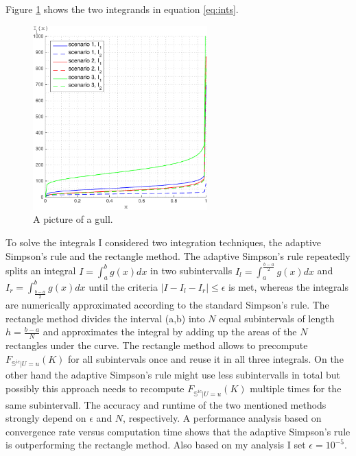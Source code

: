 \documentclass[a4paper]{article}
\begin{document}
Figure \ref{fig:ints} shows the two integrands in equation \ref{eq:ints}. 
\begin{figure}[h!]
	\centering
	\includegraphics[width=0.6\textwidth]{graphics/ints_noTitle.pdf}
	\caption{A picture of a gull.}
	\label{fig:ints}
\end{figure}
To solve the integrals I considered two integration techniques, the adaptive Simpson's rule and the rectangle method. The adaptive Simpson's rule repeatedly splits an integral $I = \int_a^b g(x) dx$ in two subintervalls $ I_l = \int_a^{\frac{b-a}{2}} g(x) dx$ and $I_r = \int_{\frac{b-a}{2}}^b g(x) dx$ until the criteria $|I-I_l-I_r| \leq \epsilon$ is met, whereas the integrals are numerically approximated according to the standard Simpson's rule. The rectangle method divides the interval (a,b) into $N$ equal subintervals of length $h=\frac{b-a}{N}$ and approximates the integral by adding up the areas of the $N$ rectangles under the curve. The rectangle method allows to precompute $F_{\mathbb{S}^{ic}|U=u}(K)$ for all subintervals once and reuse it in all three integrals. On the other hand the adaptive Simpson's rule might use less subintervalls in total but possibly this approach needs to recompute $F_{\mathbb{S}^{ic}|U=u}(K)$ multiple times for the same subintervall. The accuracy and runtime of the two mentioned methods strongly depend on $\epsilon$ and $N$, respectively. A performance analysis based on convergence rate versus computation time shows that the adaptive Simpson's rule is outperforming the rectangle method. Also based on my analysis I set $\epsilon = 10^{-5}$. 
\end{document}
